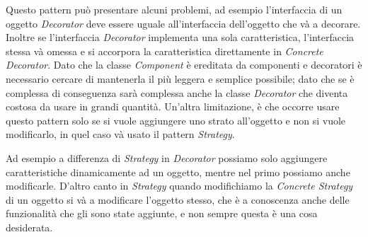 Questo pattern può presentare alcuni problemi, ad esempio l'interfaccia
di un oggetto \emph{Decorator} deve essere uguale all'interfaccia dell'oggetto che và
a decorare. Inoltre se l'interfaccia \emph{Decorator} implementa una sola caratteristica, l'interfaccia
stessa và omessa e si accorpora la caratteristica direttamente in \emph{Concrete Decorator}. Dato
che la classe \emph{Component} è ereditata da componenti e decoratori è necessario
cercare di mantenerla il più leggera e semplice possibile; dato che se è complessa di conseguenza
sarà complessa anche la classe \emph{Decorator} che diventa costosa da usare in grandi
quantità. Un'altra limitazione, è che occorre usare questo pattern solo se si vuole aggiungere uno
strato all'oggetto e non si vuole modificarlo, in quel caso và usato il pattern \emph{Strategy}.

Ad esempio a differenza di \emph{Strategy} in \emph{Decorator} possiamo solo aggiungere
caratteristiche dinamicamente ad un oggetto, mentre nel primo possiamo anche modificarle.
D'altro canto in \emph{Strategy} quando modifichiamo la \emph{Concrete Strategy} di un oggetto
si và a modificare l'oggetto stesso, che è a conoscenza anche delle funzionalità
che gli sono state aggiunte, e non sempre questa è una cosa desiderata. 